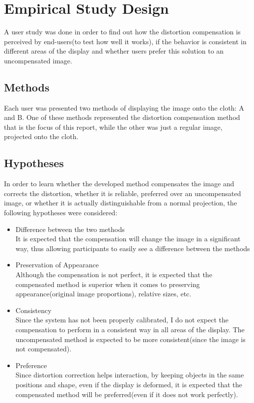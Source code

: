 \documentclass[]{article}
\begin{document}
\clearpage
\section{Empirical Study Design}
\label{sec:EmpiricalStudy}

A user study was done in order to find out how the distortion compensation is perceived by end-users(to test how well it works), if the behavior is consistent in different areas of the display and whether users prefer this solution to an uncompensated image. 

\subsection{Methods}

Each user was presented two methods of displaying the image onto the cloth: A and B. One of these methods represented the distortion compensation method that is the focus of this report, while the other was just a regular image, projected onto the cloth. 

\subsection{Hypotheses}
\label{sec:hypotheses}
In order to learn whether the developed method compensates the image and corrects the distortion, whether it is reliable, preferred over an uncompensated image, or whether it is actually distinguishable from a normal projection, the following hypotheses were considered:

\begin{itemize}
\item Difference between the two methods\\

It is expected that the compensation will change the image in a significant way, thus allowing participants to easily see a difference between the methods
\item Preservation of Appearance\\

Although the compensation is not perfect, it is expected that the compensated method is superior when it comes to preserving appearance(original image proportions), relative sizes, etc.
\item Consistency\\

Since the system has not been properly calibrated, I do not expect the compensation to perform in a consistent way in all areas of the display. The uncompensated method is expected to be more consistent(since the image is not compensated).
\item Preference\\

Since distortion correction helps interaction, by keeping objects in the same positions and shape, even if the display is deformed, it is expected that the compensated method will be preferred(even if it does not work perfectly).
\end{itemize}
\end{document}
